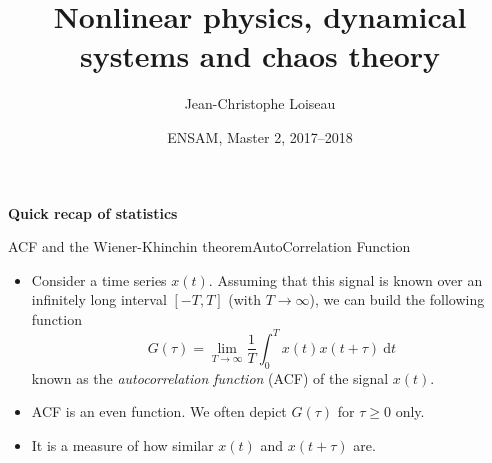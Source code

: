 \documentclass[usenames,dvipsnames,svgnames,10pt,aspectratio=169]{beamer}
\title[Nonlinear Physics] %
{
	Nonlinear physics, dynamical \\ systems and chaos theory
}
\author[J.-Ch.~Loiseau] %
{
	Jean-Christophe Loiseau
}
\institute[unused]
{
	\url{jean-christophe.loiseau@ensam.eu} \\
	DynFluid, \\
	Arts et M\'etiers ParisTech, France
}
\date[unused]{ENSAM, Master 2, 2017--2018}
\begin{document}
\titleframe %

\begin{frame}[t, c]{}
	\centering
	\vspace{1cm}

	{\Large \textbf{Quick recap of statistics}}

	\bigskip

	{}

\end{frame}

\begin{frame}[t, c]{ACF and the Wiener-Khinchin theorem}{AutoCorrelation Function}
	\begin{itemize}
		\item Consider a time series $x(t)$. Assuming that this signal is known over an infinitely long interval $\left[ -T, T \right]$ (with $T \to \infty$), we can build the following function
		$$
			G(\tau) = \lim_{T \to \infty} \frac{1}{T} \int_0^T x(t) x(t+\tau) \ \mathrm{d}t
		$$
		known as the \emph{autocorrelation function} (ACF) of the signal $x(t)$.

		\medskip

		\item ACF is an even function. We often depict $G(\tau)$ for $\tau \ge 0$ only.

		\medskip

		\item It is a measure of how similar $x(t)$ and $x(t+\tau)$ are.
	\end{itemize}

	\vspace{1cm}
\end{frame}
\end{document}
